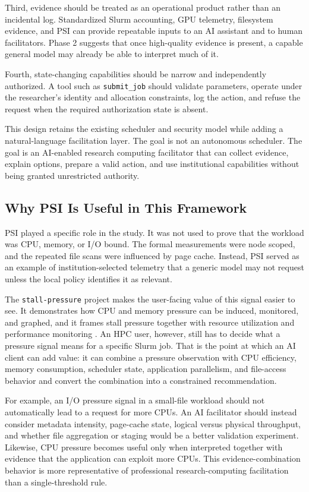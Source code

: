 \documentclass[11pt]{article}
\begin{document}
Third, evidence should be treated as an operational product rather than an incidental log. Standardized Slurm accounting, GPU telemetry, filesystem evidence, and PSI can provide repeatable inputs to an AI assistant and to human facilitators. Phase 2 suggests that once high-quality evidence is present, a capable general model may already be able to interpret much of it.

Fourth, state-changing capabilities should be narrow and independently authorized. A tool such as \texttt{submit\_job} should validate parameters, operate under the researcher's identity and allocation constraints, log the action, and refuse the request when the required authorization state is absent.

This design retains the existing scheduler and security model while adding a natural-language facilitation layer. The goal is not an autonomous scheduler. The goal is an AI-enabled research computing facilitator that can collect evidence, explain options, prepare a valid action, and use institutional capabilities without being granted unrestricted authority.

\subsection{Why PSI Is Useful in This Framework}

PSI played a specific role in the study. It was not used to prove that the workload was CPU, memory, or I/O bound. The formal measurements were node scoped, and the repeated file scans were influenced by page cache. Instead, PSI served as an example of institution-selected telemetry that a generic model may not request unless the local policy identifies it as relevant.

The \texttt{stall-pressure} project makes the user-facing value of this signal easier to see. It demonstrates how CPU and memory pressure can be induced, monitored, and graphed, and it frames stall pressure together with resource utilization and performance monitoring \cite{stallpressure}. An HPC user, however, still has to decide what a pressure signal means for a specific Slurm job. That is the point at which an AI client can add value: it can combine a pressure observation with CPU efficiency, memory consumption, scheduler state, application parallelism, and file-access behavior and convert the combination into a constrained recommendation.

For example, an I/O pressure signal in a small-file workload should not automatically lead to a request for more CPUs. An AI facilitator should instead consider metadata intensity, page-cache state, logical versus physical throughput, and whether file aggregation or staging would be a better validation experiment. Likewise, CPU pressure becomes useful only when interpreted together with evidence that the application can exploit more CPUs. This evidence-combination behavior is more representative of professional research-computing facilitation than a single-threshold rule.
\end{document}
